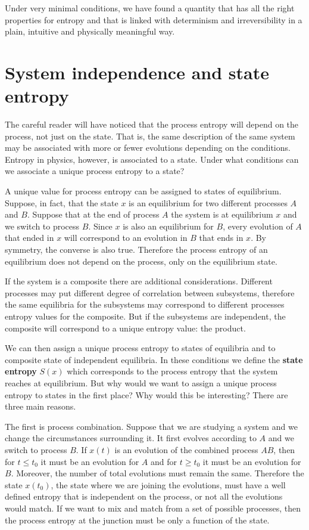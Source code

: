 \documentclass[letterpaper,twocolumn]{article}
\begin{document}
Under very minimal conditions, we have found a quantity that has all the right properties for entropy and that is linked with determinism and irreversibility in a plain, intuitive and physically meaningful way.

\section{System independence and state entropy}

The careful reader will have noticed that the process entropy will depend on the process, not just on the state. That is, the same description of the same system may be associated with more or fewer evolutions depending on the conditions. Entropy in physics, however, is associated to a state. Under what conditions can we associate a unique process entropy to a state?

A unique value for process entropy can be assigned to states of equilibrium. Suppose, in fact, that the state $x$ is an equilibrium for two different processes $A$ and $B$. Suppose that at the end of process $A$ the system is at equilibrium $x$ and we switch to process $B$. Since $x$ is also an equilibrium for $B$, every evolution of $A$ that ended in $x$ will correspond to an evolution in $B$ that ends in $x$. By symmetry, the converse is also true. Therefore the process entropy of an equilibrium does not depend on the process, only on the equilibrium state.

If the system is a composite there are additional considerations. Different processes may put different degree of correlation between subsystems, therefore the same equilibria for the subsystems may correspond to different processes entropy values for the composite. But if the subsystems are independent, the composite will correspond to a unique entropy value: the product.

We can then assign a unique process entropy to states of equilibria and to composite state of independent equilibria. In these conditions we define the \textbf{state entropy} $S(x)$ which corresponds to the process entropy that the system reaches at equilibrium. But why would we want to assign a unique process entropy to states in the first place? Why would this be interesting? There are three main reasons.

The first is process combination. Suppose that we are studying a system and we change the circumstances surrounding it. It first evolves according to $A$ and we switch to process $B$. If $x(t)$ is an evolution of the combined process $AB$, then for $t\leq t_0$ it must be an evolution for $A$ and for $t\geq t_0$ it must be an evolution for $B$. Moreover, the number of total evolutions must remain the same. Therefore the state $x(t_0)$, the state where we are joining the evolutions, must have a well defined entropy that is independent on the process, or not all the evolutions would match. If we want to mix and match from a set of possible processes, then the process entropy at the junction must be only a function of the state.
\end{document}
